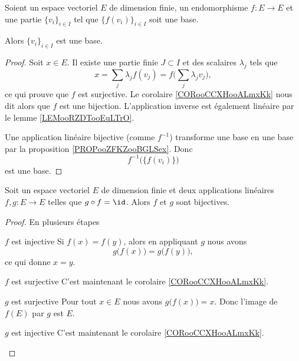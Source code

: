 \begin{proposition}     \label{PROPooHLUYooNsDgbn}
    Soient un espace vectoriel \( E\) de dimension finie, un endomorphisme \( f\colon E\to E\) et une partie \( \{v_i\}_{i\in I}\) tel que \( \{f(v_i)\}_{i\in I}\) soit une base.

    Alors \( \{v_i\}_{i\in I}\) est une base.
\end{proposition}

\begin{proof}
    Soit \( x\in E\). Il existe une partie finie \( J\subset I\) et des scalaires \( \lambda_j\) tels que 
    \begin{equation}
        x=\sum_j\lambda_jf(v_j)=f\big( \sum_j\lambda_jv_j \big),
    \end{equation}
    ce qui prouve que \( f\) est surjective. Le corolaire \ref{CORooCCXHooALmxKk} nous dit alors que \( f\) est une bijection. L'application inverse est également linéaire par le lemme \ref{LEMooRZDTooEuLTrO}.

    Une application linéaire bijective (comme \( f^{-1}\)) transforme une base en une base par la proposition \ref{PROPooZFKZooBGLSex}. Donc 
    \begin{equation}
        f^{-1}\big( \{f(v_i)\} \big)
    \end{equation}
    est une base.
\end{proof}

\begin{proposition}     \label{PROPooADESooATJSrH}
    Soit un espace vectoriel \( E\) de dimension finie et deux applications linéaires \( f,g\colon E\to E\) telles que \( g\circ f=\id\). Alors \( f\) et \( g\) sont bijectives.
\end{proposition}

\begin{proof}
    En plusieurs étapes
    \begin{subproof}
        \item[\( f\) est injective]
            Si \( f(x)=f(y)\), alors en appliquant \( g\) nous avons 
            \begin{equation}
                g\big( f(x) \big)=g\big( f(y) \big),
            \end{equation}
            ce qui donne \( x=y\).
        \item[\( f\) est surjective]
            C'est maintenant le corolaire \ref{CORooCCXHooALmxKk}.
        \item[\( g\) est surjective]
            Pour tout \( x\in E\) nous avons \( g\big( f(x) \big)=x\). Donc l'image de \( f(E)\) par \( g\) est $E$. 
        \item[\( g\) est injective]
            C'est maintenant le corolaire \ref{CORooCCXHooALmxKk}.
    \end{subproof}
\end{proof}

